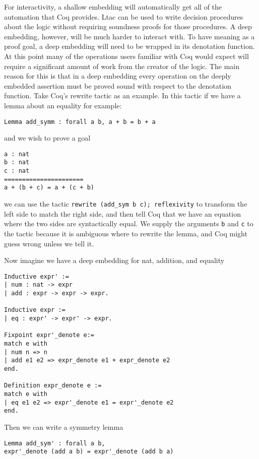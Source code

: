 \documentclass{puthesis}
\begin{document}
For interactivity, a shallow embedding will automatically get all of
the automation that Coq provides. Ltac can be used to write decision
procedures about the logic without requiring soundness proofs for
those procedures. A deep embedding, however, will be much harder to
interact with. To have meaning as a proof goal, a deep embedding will
need to be wrapped in its denotation function. At this point many of
the operations users familiar with Coq would expect will require a
significant amount of work from the creator of the logic. The main
reason for this is that in a deep embedding every operation on the
deeply embedded assertion must be proved sound with respect to the
denotation function. Take Coq's rewrite tactic as an example. In this
tactic if we have a lemma about an equality for example:

\begin{lstlisting}
Lemma add_symm : forall a b, a + b = b + a
\end{lstlisting}

and we wish to prove a goal 

\begin{lstlisting}
a : nat
b : nat
c : nat
======================
a + (b + c) = a + (c + b) 
\end{lstlisting}

we can use the tactic \lstinline|rewrite (add_sym b c); reflexivity|
to transform the left side to match the right side, and then tell Coq
that we have an equation where the two sides are syntactically
equal. We supply the arguments \lstinline|b| and \lstinline|c| to the
tactic because it is ambiguous where to rewrite the lemma, and Coq
might guess wrong unless we tell it.

Now imagine we have a deep embedding for nat, addition, and equality

\begin{lstlisting}
Inductive expr' :=
| num : nat -> expr
| add : expr -> expr -> expr.

Inductive expr :=
| eq : expr' -> expr' -> expr.

Fixpoint expr'_denote e:=
match e with
| num n => n
| add e1 e2 => expr_denote e1 + expr_denote e2
end.

Definition expr_denote e :=
match e with
| eq e1 e2 => expr'_denote e1 = expr'_denote e2
end.
\end{lstlisting} 

Then we can write a symmetry lemma

\begin{lstlisting}
Lemma add_sym' : forall a b, 
expr'_denote (add a b) = expr'_denote (add b a)
\end{lstlisting}
\end{document}
